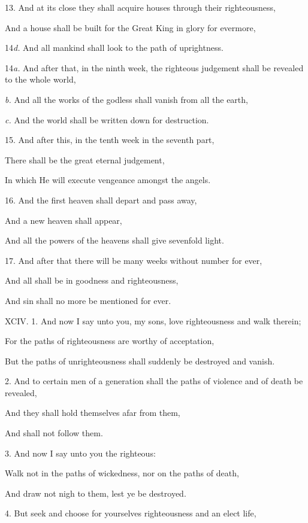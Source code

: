 13. And at its close they shall acquire houses through their righteousness,

And a house shall be built for the Great King in glory for evermore,

14\emph{d.} And all mankind shall look to the path of uprightness.

14\emph{a.} And after that, in the ninth week, the righteous judgement shall be revealed to the whole world,

\emph{b.} And all the works of the godless shall vanish from all the earth,

\emph{c.} And the world shall be written down for destruction.

15. And after this, in the tenth week in the seventh part,

There shall be the great eternal judgement,

In which He will execute vengeance amongst the angels.

16. And the first heaven shall depart and pass away,

And a new heaven shall appear,

And all the powers of the heavens shall give sevenfold light.

17. And after that there will be many weeks without number for ever,

And all shall be in goodness and righteousness,

And sin shall no more be mentioned for ever.


XCIV. 1. And now I say unto you, my sons, love righteousness and walk therein;

For the paths of righteousness are worthy of acceptation,

But the paths of unrighteousness shall suddenly be destroyed and vanish.

2. And to certain men of a generation shall the paths of violence and of death be revealed,

And they shall hold themselves afar from them,

And shall not follow them.

3. And now I say unto you the righteous:

Walk not in the paths of wickedness, nor on the paths of death,

And draw not nigh to them, lest ye be destroyed.

4. But seek and choose for yourselves righteousness and an elect life,

